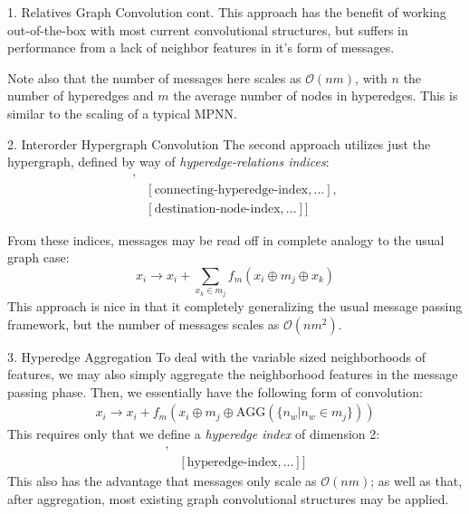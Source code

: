 \documentclass[11pt]{beamer}
\begin{document}
\begin{frame}{1. Relatives Graph Convolution cont.}
This approach has the benefit of working out-of-the-box with most current convolutional structures, but suffers in performance from a lack of neighbor features in it's form of messages.

\vspace{1cm}\pause

Note also that the number of messages here scales as $\mathcal{O}(nm)$, with $n$ the number of hyperedges and $m$ the average number of nodes in hyperedges. \pause This is similar to the scaling of a typical MPNN.
\end{frame}

\begin{frame}{2. Interorder Hypergraph Convolution}
The second approach utilizes just the hypergraph, defined by way of \textit{hyperedge-relations indices}:
\begin{align*}
[&[\text{origin-node-index},...],\\
&[\text{connecting-hyperedge-index},...],\\
&[\text{destination-node-index},...]]
\end{align*}

\medskip\pause

From these indices, messages may be read off in complete analogy to the usual graph case:
$$
x_i \rightarrow x_i + \sum_{x_k \in m_j} f_m(x_i\oplus m_j\oplus x_k)
$$\pause
This approach is nice in that it completely generalizing the usual message passing framework, but the number of messages scales as $\mathcal{O}(nm^2)$.

\end{frame}

\begin{frame}{3. Hyperedge Aggregation}
To deal with the variable sized neighborhoods of features, we may also simply aggregate the neighborhood features in the message passing phase\pause . Then, we essentially have the following form of convolution:
\begin{align*}
x_i \rightarrow x_i + f_m(x_i\oplus m_{j} \oplus \text{AGG}(\lbrace  n_w \vert n_w \in m_j \rbrace))
\end{align*}
This requires only that we define a \textit{hyperedge index} of dimension 2:
\begin{align*}
[&[\text{node-index},...],\\
&[\text{hyperedge-index},...]]
\end{align*}\pause
This also has the advantage that messages only scale as $\mathcal{O}(nm)$; as well as that, after aggregation, most existing graph convolutional structures may be applied.
\end{frame}
\end{document}
